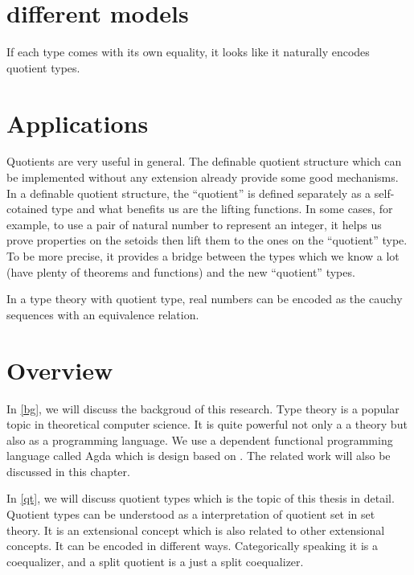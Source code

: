 \section{different models}

If each type comes with its own equality, it looks like it naturally
encodes quotient types.


\section{Applications}


Quotients are very useful in general. The definable quotient structure
which can be implemented without any extension already provide some
good mechanisms. In a definable quotient structure, the ``quotient''
is defined separately as a self-cotained type and what benefits us are
the lifting functions. In some cases, for example, to use a pair of
natural number to represent an integer, it helps us prove properties
on the setoids then lift them to the ones on the ``quotient'' type. To
be more precise, it provides a bridge between the types which we know
a lot (have plenty of theorems and functions) and the new
``quotient'' types.


In a type theory with quotient type, real numbers can be encoded as
the cauchy sequences with an equivalence relation.






\section{Overview}





In \autoref{bg}, we will discuss the backgroud of this research. Type theory is a popular topic in
theoretical computer science. It is quite powerful not only a a theory
but also as a programming language. We use a dependent functional
programming language called Agda which is design based on \mltt. The
 related work will also be discussed in this chapter.


In \autoref{qt}, we will discuss quotient types which is the topic of
this thesis in detail. Quotient types
can be understood as a interpretation of quotient set in set
theory. It is an extensional concept which is also related to other extensional concepts. It can be encoded in different ways. Categorically speaking it
is a coequalizer, and a split quotient is a just a split coequalizer.


